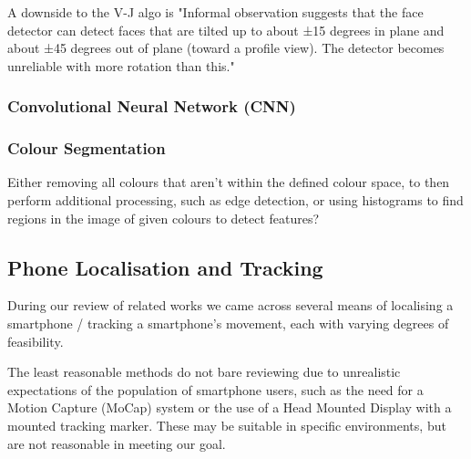 A downside to the V-J algo is "Informal observation suggests that the face detector can detect faces that are tilted up to about ±15 degrees in plane and about ±45 degrees out of plane (toward a profile view). The detector becomes unreliable with more rotation than this."\cite{viola2004robust}


\subsubsection{Convolutional Neural Network (CNN)}\nl

\cite{yan2021fast}



\subsubsection{Colour Segmentation}\nl
Either removing all colours that aren't within the defined colour space, to then perform additional processing, such as edge detection, or using histograms to find regions in the image of given colours to detect features?


\subsection{Phone Localisation and Tracking}
During our review of related works we came across several means of localising a smartphone / tracking a smartphone's movement, each with varying degrees of feasibility.

The least reasonable methods do not bare reviewing due to unrealistic expectations of the population of smartphone users, such as the need for a Motion Capture (MoCap) system\cite{buschel2017investigating} or the use of a Head Mounted Display with a mounted tracking marker\cite{mohr2019trackcap}.
These may be suitable in specific environments, but are not reasonable in meeting our goal.

